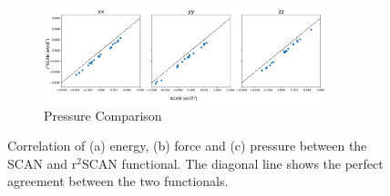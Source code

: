 \begin{figure}[tbhp]
\begin{subfigure}{0.9\textwidth}
		\includegraphics[width=0.9\textwidth]{images/scan_vs_r2scan/pressure_compare.png}
		\caption{Pressure Comparison}
		\label{fig:scan_r2scan_P}
	\end{subfigure}
	\caption{Correlation of  (a) energy, (b) force and (c) pressure between the
		SCAN and
		r$^2$SCAN functional. The diagonal line shows the perfect agreement between
		the two functionals.}
	\label{fig:scan_r2scan}
\end{figure}

